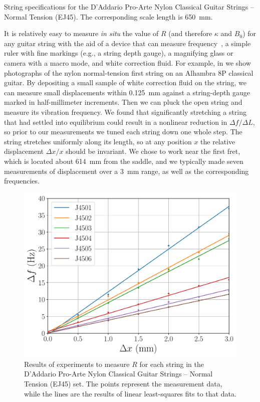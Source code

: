 \begin{table}
  \centering
  \caption{\label{tbl:ej45_mks} String specifications for the D'Addario Pro-Arte Nylon Classical Guitar Strings -- Normal Tension (EJ45). The corresponding scale length is 650~mm.}
  
\end{table}%

It is relatively easy to measure \emph{in situ} the value of $R$ (and therefore $\kappa$ and $B_0$) for any guitar string with the aid of a  device that can measure frequency~\cite{ref:pgtweb}, a simple ruler with fine markings (e.g., a string depth gauge), a magnifying glass or camera with a macro mode, and white correction fluid. For example, in  we show photographs of the nylon normal-tension first string on an Alhambra 8P classical guitar. By depositing a small sample of white correction fluid on the string, we can measure small displacements within 0.125~mm against a string-depth gauge marked in half-millimeter increments. Then we can pluck the open string and measure its vibration frequency. We found that significantly stretching a string that had settled into equilibrium could result in a nonlinear reduction in $\Delta f/\Delta L$, so prior to our measurements we tuned each string down one whole step. The string stretches uniformly along its length, so at any position $x$ the relative displacement $\Delta x/x$ should be invariant. We chose to work near the first fret, which is located about 614~mm from the saddle, and we typically made seven measurements of displacement over a 3~mm range, as well as the corresponding frequencies.

\begin{figure}
  \centering
  \includegraphics[width=5.0in]{../figures/fit_ej45}
  \caption{\label{fig:fit_ej45} Results of experiments to measure $R$ for each string in the D'Addario Pro-Arte Nylon Classical Guitar Strings -- Normal Tension (EJ45) set. The points represent the measurement data, while the lines are the results of linear least-squares fits to that data.}
 \end{figure}

